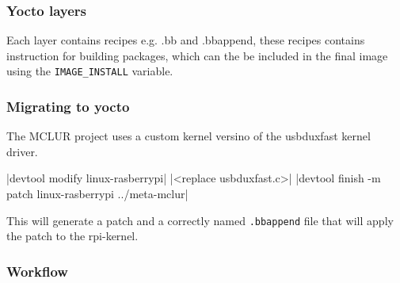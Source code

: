 \documentclass[../../main.tex]{subfiles}
\begin{document}
\subsubsection{Yocto layers}%
\label{ssub:yocto_layers}


Each layer contains recipes e.g. .bb and .bbappend, these recipes contains instruction for
building packages, which can the be included in the final image
using the \texttt{IMAGE\_INSTALL} variable.


\subsubsection{Migrating to yocto}%
\label{ssub:migrating_to_yocto}

The MCLUR project uses a custom kernel versino of the usbduxfast kernel driver.

|devtool modify linux-rasberrypi|
|<replace usbduxfast.c>|
|devtool finish -m patch linux-rasberrypi ../meta-mclur|

This will generate a patch and a correctly named \texttt{.bbappend} file that will
apply the patch to the rpi-kernel.

\subsubsection{Workflow}%
\label{ssub:workflow}

\end{document}
